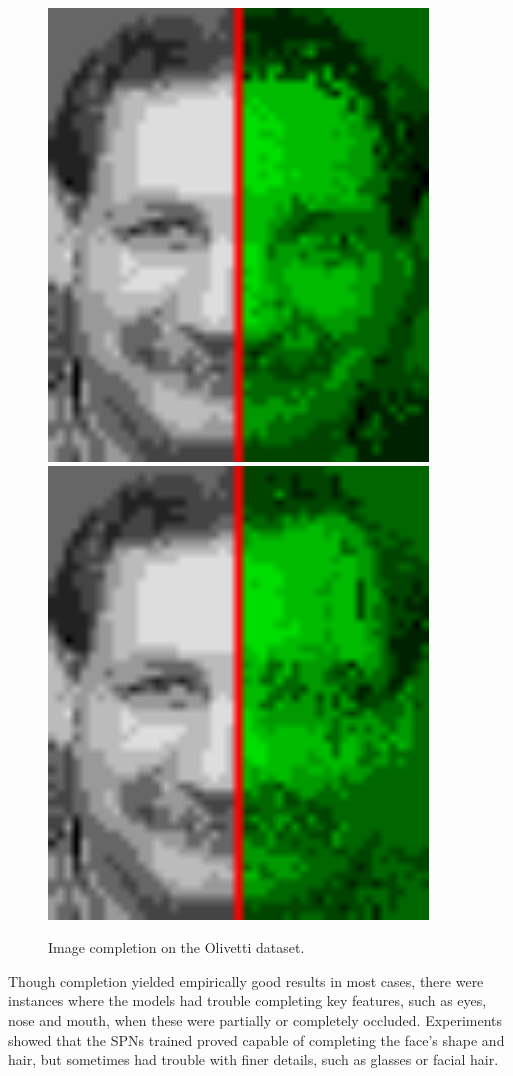 \documentclass[final,hyperref={pdfpagelabels=false},notheorems]{beamer}
\theoremstyle{thesisstyle}
\newcommand{\pskip}{\vskip 0.5cm}
\begin{document}
\begin{frame}[t]
\begin{columns}[t]
\begin{column}{.5225\textwidth}
\begin{block}{}
      \begin{figure}[h]
        \centering\includegraphics[height=12cm]{imgs/gens_cmpl.png}
        \includegraphics[height=12cm]{imgs/dennis_cmpl.png}
        \caption{Image completion on the Olivetti dataset.}
      \end{figure}

      Though completion yielded empirically good results in most cases, there were instances where
      the models had trouble completing key features, such as eyes, nose and mouth, when these were
      partially or completely occluded. Experiments showed that the SPNs trained proved capable of
      completing the face's shape and hair, but sometimes had trouble with finer details, such as
      glasses or facial hair.\pskip


\end{block}
\end{column}
\end{columns}
\end{frame}
\end{document}
